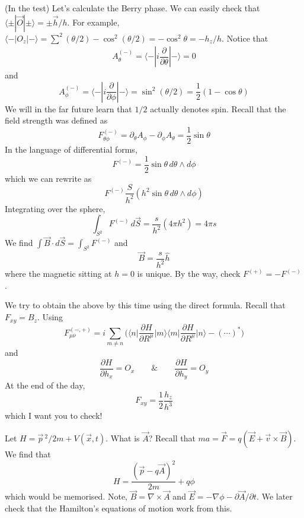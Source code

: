 \vspace{2ex}
\begin{cor}
(In the test) Let's calculate the Berry phase. We can easily check that $\langle \pm |\vec{O}|\pm \rangle =\pm \vec{h}/h$. For example, $\langle -|O_{z}|-\rangle =\sum ^2(\theta /2)-\cos ^2(\theta /2)=-\cos ^2\theta =-h_{z}/h$. Notice that
\[\begin{align*}
A^{(-)}_{\theta }=\langle -|i\dfrac{\partial }{\partial \theta }|-\rangle =0 
\end{align*}\]
and
\[A^{(-)}_{\phi }=\langle -|i\dfrac{\partial }{\partial \phi }|-\rangle =\sin ^2(\theta /2)=\dfrac{1}{2}(1-\cos \theta )\]
We will in the far future learn that $1/2$ actually denotes spin. Recall that the field strength was defined as
\[F^{(-)}_{\theta \phi }=\partial _{\theta }A_{\phi }-\partial _{\phi }A_{\theta }=\dfrac{1}{2}\sin \theta \]
In the language of differential forms,
\[F^{(-)}=\dfrac{1}{2}\sin \theta \,d\theta \wedge d\phi \]
which we can rewrite as
\[F^{(-)}\dfrac{S}{h ^2}(h ^2\sin \theta \,d\theta \wedge d\phi )\]
Integrating over the sphere,
\[\int _{S^2}F^{(-)}\,d\vec{S}=\dfrac{s}{h ^2}(4\pi h ^2)=4\pi s\]
We find $\int \vec{B}\cdot d\vec{S}=\int_{S^2} F^{(-)}$ and 
\[\vec{B}=\dfrac{s}{h ^2}\hat{h}\]
where the magnetic sitting at $h=0$ is unique. By the way, check $F^{(+)}=-F^{(-)}$. 
\end{cor}
\vspace{2ex}
\begin{ex}
We try to obtain the above by this time using the direct formula. Recall that $F_{xy}=B_{z}$. Using
\[F^{(-,+)}_{\mu \nu }=i\sum _{m\ne n}\Big(\Big\langle n\Big|\dfrac{\partial H}{\partial R^{\mu }}\Big|m\Big\rangle \Big\langle m\Big|\dfrac{\partial H}{\partial R^{\mu }}\Big|n\Big\rangle -(\cdots)^{*}\Big)  \]
and 
\[\dfrac{\partial H}{\partial h_{x}}=O_{x}\qquad\&\qquad \dfrac{\partial H}{\partial h_{y}}=O_{y}  \]
At the end of the day,
\[F_{xy}=\dfrac{1}{2}\dfrac{h_{z}}{h^3}\]
which I want you to check! 
\end{ex}
\vspace{2ex}
\begin{cor}
Let $H=\vec{p}\,^2/2m+V(\vec{x},t)$. What is $\vec{A}$? Recall that $ma=\vec{F}=q(\vec{E}+\vec{v}\times \vec{B})$. We find that 
\[H=\dfrac{(\vec{p}-q\vec{A})^2}{2m}+q\phi \]
which would be memorised. Note, $\vec{B}=\nabla \times \vec{A}$ and $\vec{E}=-\nabla \phi -\partial \vec{A}/\partial t$. We later check that the Hamilton's equations of motion work from this. 
\end{cor}
\vspace{2ex}

